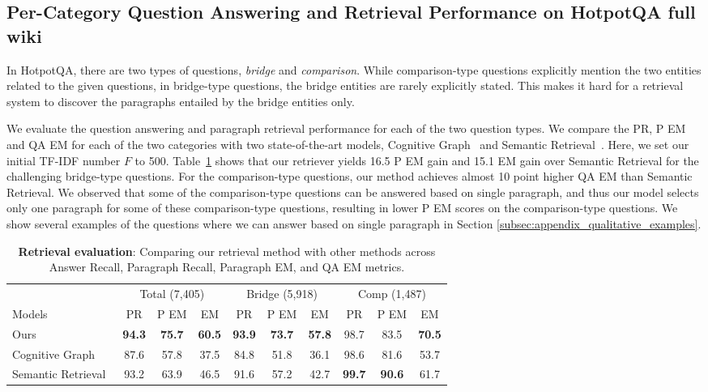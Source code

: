 \subsection{Per-Category Question Answering and Retrieval Performance on HotpotQA full wiki}
In HotpotQA, there are two types of questions, {\it bridge} and {\it comparison}. 
While comparison-type questions explicitly mention the two entities related to the given questions, in bridge-type questions, the bridge entities are rarely explicitly stated. 
This makes it hard for a retrieval system to discover the paragraphs entailed by the bridge entities only. 

We evaluate the question answering and paragraph retrieval performance for each of the two question types. 
We compare the PR, P EM and QA EM for each of the two categories with two state-of-the-art models, Cognitive Graph~\citep{cognitive_graph_2019} and Semantic Retrieval~\citep{nie_pip_2019}. 
Here, we set our initial TF-IDF number $F$ to 500. 
Table~\ref{table:retrieval_results_per_category} shows that our retriever yields 16.5 P EM gain and 15.1 EM gain over Semantic Retrieval for the challenging bridge-type questions. 
For the comparison-type questions, our method achieves almost 10 point higher QA EM than Semantic Retrieval. 
We observed that some of the comparison-type questions can be answered based on single paragraph, and thus our model selects only one paragraph for some of these comparison-type questions, resulting in lower P EM scores on the comparison-type questions. 
We show several examples of the questions where we can answer based on single paragraph in Section \ref{subsec:appendix_qualitative_examples}.

\begin{table}[!tb]
    \centering
    \small{
\begin{tabular}{ l | c c c | c c c | cc c}\toprule 
& \multicolumn{3}{c}{Total (7,405)} & \multicolumn{3}{|c|}{Bridge (5,918)} &  \multicolumn{3}{c}{Comp (1,487)}  \\
 Models  & PR & P EM & EM & PR & P EM & EM & PR & P EM & EM  \\
  \midrule
  Ours  & \bf 94.3& \bf 75.7 & \bf 60.5& \bf 93.9 & \bf 73.7 & \bf 57.8& 98.7 & 83.5 & \bf 70.5\\\hdashline
  Cognitive Graph~\citep{cognitive_graph_2019} & 87.6& 57.8 & 37.5 & 84.8 & 51.8 & 36.1&  98.6 & 81.6 & 53.7\\
  Semantic Retrieval~\citep{nie_pip_2019} & 93.2 & 63.9 & 46.5 & 91.6 & 57.2 & 42.7& \bf 99.7 & \bf 90.6 & 61.7\\
  \bottomrule
\end{tabular}
    \caption{{\bf Retrieval evaluation}: Comparing our retrieval method with other methods across Answer Recall, Paragraph Recall, Paragraph EM, and QA EM metrics.
    }\label{table:retrieval_results_per_category}
    }
\end{table}

